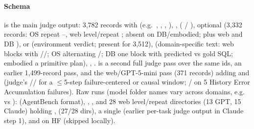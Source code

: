 \paragraph{Schema}  is the main judge output: 3,782 records with  (e.g.\ , , , ), ,  ( / ), optional  (3,332 records: OS repeat --, web level/repeat ; absent on DB/embodied; plus web  and DB ),  or  (environment verdict; present for 3,512),  (domain-specific text: web \code{[Step n]} blocks with //; OS alternating \code{[Agent]}/\code{[OS response]}; DB one block with predicted vs gold SQL; embodied a primitive plan), , .  is a second full judge pass over the same ids,  an earlier 1,499-record pass, and  the web/GPT-5-mini pass (371 records) adding  and  (judge's // for a $\le$5-step failure-centered or causal window; /\code{[]} on 5 History Error Accumulation failures). Raw runs (model folder names vary across domains, e.g.\  vs ):  (AgentBench format), , , and 28 web level/repeat directories  (13 GPT, 15 Claude) holding ,  (27/28 dirs), a single  (earlier per-task judge output in Claude step 1), and on HF  (skipped locally).


